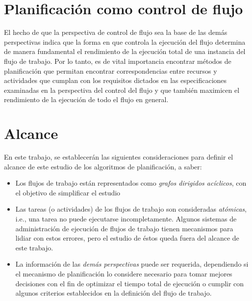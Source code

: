 \section{Planificación como control de flujo}

El hecho de que la perspectiva de control de flujo sea la base de las demás perspectivas indica que la forma en que controla la ejecución del flujo determina de manera fundamental el rendimiento de la ejecución total de una instancia del flujo de trabajo. Por lo tanto, es de vital importancia encontrar métodos de planificación que permitan encontrar correspondencias entre recursos y actividades que cumplan con los requisitos dictados en las especificaciones examinadas en la perspectiva del control del flujo y que también maximicen el rendimiento de la ejecución de todo el flujo en general.

\section{Alcance}

En este trabajo, se establecerán las siguientes consideraciones para definir el alcance de este estudio de los algoritmos de planificación, a saber:

\begin{itemize}
\item{Los flujos de trabajo están representados como \emph{grafos dirigidos acíclicos}, con el objetivo de simplificar el estudio}

\item{Las tareas (o actividades) de los flujos de trabajo son consideradas \emph{atómicas}, i.e., una tarea no puede ejecutarse incompletamente. Algunos sistemas de administración de ejecución de flujos de trabajo tienen mecanismos para lidiar con estos errores, pero el estudio de éstos queda fuera del alcance de este trabajo.}

\item{La información de las \emph{demás perspectivas} puede ser requerida, dependiendo si el mecanismo de planificación lo considere necesario para tomar mejores decisiones con el fin de optimizar el tiempo total de ejecución o cumplir con algunos criterios establecidos en la definición del flujo de trabajo.}
\end{itemize}



